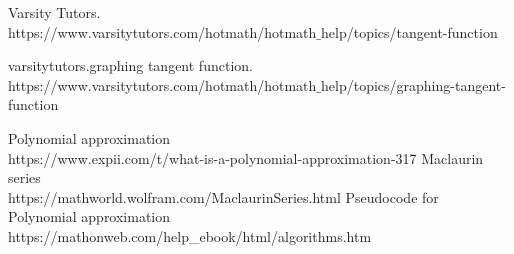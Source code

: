 \documentclass[letterpaper, 11pt]{report}
\begin{document}
\begin{thebibliography}{}
Varsity Tutors.
\\https://www.varsitytutors.com/hotmath/hotmath$\_$help/topics/tangent-function

varsitytutors.graphing tangent function. 
\\https://www.varsitytutors.com/hotmath/hotmath$\_$help/topics/graphing-tangent-function

Polynomial approximation
\\https://www.expii.com/t/what-is-a-polynomial-approximation-317
Maclaurin series
\\https://mathworld.wolfram.com/MaclaurinSeries.html
Pseudocode for Polynomial approximation\\https://mathonweb.com/help\_ebook/html/algorithms.htm
\end{thebibliography}
\end{document}
